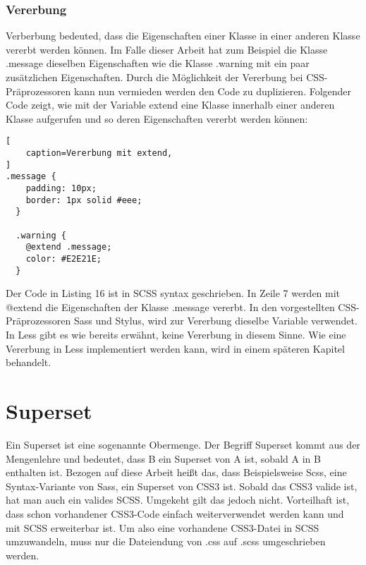 \subsubsection{Vererbung}
Verberbung bedeuted, dass die Eigenschaften einer Klasse in einer anderen Klasse vererbt werden können. Im Falle dieser Arbeit hat zum Beispiel die Klasse .message dieselben Eigenschaften wie die Klasse .warning mit ein paar zusätzlichen Eigenschaften. Durch die Möglichkeit der Vererbung bei CSS-Präprozessoren kann nun vermieden werden den Code zu duplizieren. Folgender Code zeigt, wie mit der Variable extend eine Klasse innerhalb einer anderen Klasse aufgerufen und so deren Eigenschaften vererbt werden können:
\begin{lstlisting}[
	caption=Vererbung mit extend,
]
.message {
    padding: 10px;
    border: 1px solid #eee;
  }

  .warning {
    @extend .message;
    color: #E2E21E;
  }
\end{lstlisting}
Der Code in Listing 16 ist in SCSS syntax geschrieben. In Zeile 7 werden mit @extend die Eigenschaften der Klasse .message vererbt. In den vorgestellten CSS-Präprozessoren Sass und Stylus, wird zur Vererbung dieselbe Variable verwendet. In Less gibt es wie bereits erwähnt, keine Vererbung in diesem Sinne. Wie eine Vererbung in Less implementiert werden kann, wird in einem späteren Kapitel behandelt.
\newpage
\section{Superset} 
Ein Superset ist eine sogenannte Obermenge. Der Begriff Superset kommt aus der Mengenlehre und bedeutet, dass B ein Superset von A ist, sobald A in B enthalten ist. Bezogen auf diese Arbeit heißt das, dass Beispielsweise Scss, eine Syntax-Variante von Sass, ein Superset von CSS3 ist.\newline
Sobald das CSS3 valide ist, hat man auch ein valides SCSS. Umgekeht gilt das jedoch nicht.  Vorteilhaft ist, dass schon vorhandener CSS3-Code einfach weiterverwendet werden kann und mit SCSS erweiterbar ist. Um also eine vorhandene CSS3-Datei in SCSS umzuwandeln, muss nur die Dateiendung von .css auf .scss umgeschrieben werden.

